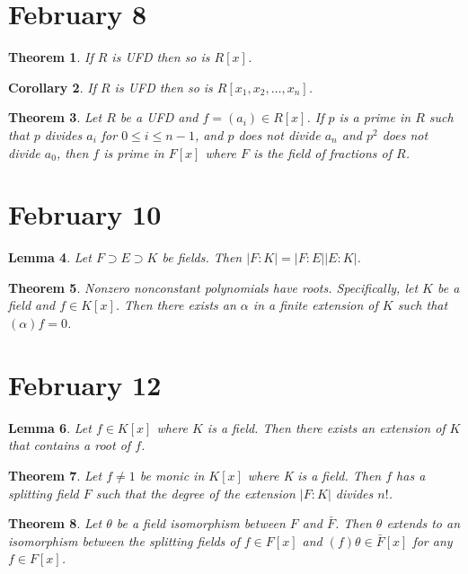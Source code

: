\documentclass[letterpaper]{article}
\newtheorem{theorem}{Theorem}[section]
\newtheorem{lemma}[theorem]{Lemma}
\newtheorem{corollary}[theorem]{Corollary}
\begin{document}
\section{February 8}

\begin{theorem}
If $R$ is UFD then so is $R[x]$.
\end{theorem}

\begin{corollary}
If $R$ is UFD then so is $R[x_1, x_2, \ldots, x_n]$.
\end{corollary}

\begin{theorem}
Let $R$ be a UFD and $f = (a_i) \in R[x]$. If $p$ is a prime in $R$ such that $p$ divides $a_i$ for $0 \leq i \leq n-1$, and $p$ does not divide $a_n$ and $p^2$ does not divide $a_0$, then $f$ is prime in $F[x]$ where $F$ is the field of fractions of $R$.
\end{theorem}

\section{February 10}

\begin{lemma}
Let $F \supset E \supset K$ be fields. Then $|F \colon K| = |F \colon E||E \colon K|$.
\end{lemma}

\begin{theorem}
Nonzero nonconstant polynomials have roots. Specifically, let $K$ be a field and $f \in K[x]$. Then there exists an $\alpha$ in a finite extension of $K$ such that $(\alpha)f = 0$.
\end{theorem}

\section{February 12}

\begin{lemma}
Let $f \in K[x]$ where $K$ is a field.  Then there exists an extension of $K$ that contains a root of $f$.
\end{lemma}

\begin{theorem}
Let $f \neq 1$ be monic in $K[x]$ where K is a field.  Then $f$ has a splitting field $F$ such that the degree of the extension $|F \colon K|$  divides $n!$.
\end{theorem}

\begin{theorem}
Let $\theta$ be a field isomorphism between $F$ and $\bar{F}$. Then $\theta$ extends to an isomorphism between the splitting fields of $f \in F[x]$ and $(f) \theta \in \bar{F}[x]$ for any $f \in F[x]$.
\end{theorem}
\end{document}
